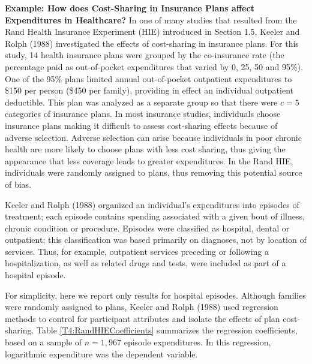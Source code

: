 \linejed {}

\textbf{Example: How does Cost-Sharing in Insurance Plans affect
Expenditures in Healthcare?} In one of many studies that resulted
from the Rand Health Insurance Experiment (HIE) introduced in
Section 1.5, Keeler and Rolph (1988) investigated the effects of
cost-sharing in insurance plans. For this study, 14 health insurance
plans were grouped by the co-insurance rate (the percentage paid as
out-of-pocket expenditures that varied by 0, 25, 50 and 95\%). One
of the 95\% plans limited annual out-of-pocket outpatient
expenditures to \$150 per person (\$450 per family), providing in
effect an individual outpatient deductible. This plan was analyzed
as a separate group so that there were $c=5$ categories of insurance
plans. In most insurance studies, individuals choose insurance plans
making it difficult to assess cost-sharing effects because of
adverse selection. Adverse selection can arise because individuals
in poor chronic health are more likely to choose plans with less
cost sharing, thus giving the appearance that less coverage leads to
greater expenditures. In the Rand HIE, individuals were randomly
assigned to plans, thus removing this potential source of bias.

Keeler and Rolph (1988) organized an individual's expenditures into
episodes of treatment; each episode contains spending associated
with a given bout of illness, chronic condition or procedure.
Episodes were classified as hospital, dental or outpatient; this
classification was based primarily on diagnoses, not by location of
services. Thus, for example, outpatient services preceding or
following a hospitalization, as well as related drugs and tests,
were included as part of a hospital episode.

For simplicity, here we report only results for hospital episodes.
Although families were randomly assigned to plans, Keeler and Rolph
(1988) used regression methods to control for participant attributes
and isolate the effects of plan cost-sharing. Table
\ref{T4:RandHIECoefficients} summarizes the regression coefficients,
based on a sample of $n=1,967$ episode expenditures. In this
regression, logarithmic expenditure was the dependent variable.

